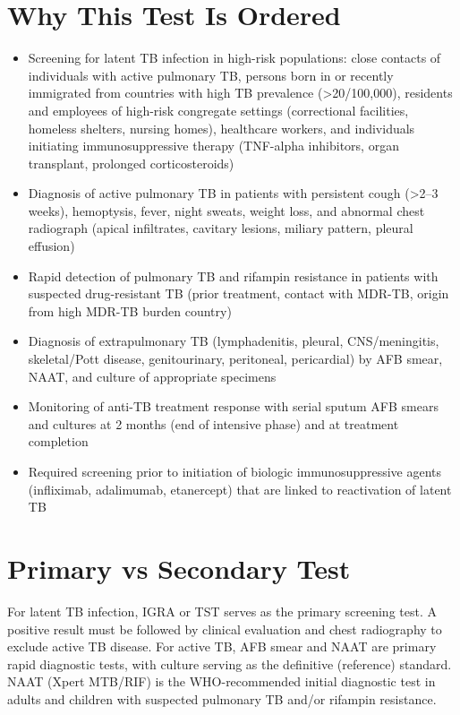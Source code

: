 \section*{Why This Test Is Ordered}
\begin{itemize}
  \item Screening for latent TB infection in high-risk populations: close contacts of individuals with active pulmonary TB, persons born in or recently immigrated from countries with high TB prevalence (>20/100,000), residents and employees of high-risk congregate settings (correctional facilities, homeless shelters, nursing homes), healthcare workers, and individuals initiating immunosuppressive therapy (TNF-alpha inhibitors, organ transplant, prolonged corticosteroids)
  \item Diagnosis of active pulmonary TB in patients with persistent cough (>2--3 weeks), hemoptysis, fever, night sweats, weight loss, and abnormal chest radiograph (apical infiltrates, cavitary lesions, miliary pattern, pleural effusion)
  \item Rapid detection of pulmonary TB and rifampin resistance in patients with suspected drug-resistant TB (prior treatment, contact with MDR-TB, origin from high MDR-TB burden country)
  \item Diagnosis of extrapulmonary TB (lymphadenitis, pleural, CNS/meningitis, skeletal/Pott disease, genitourinary, peritoneal, pericardial) by AFB smear, NAAT, and culture of appropriate specimens
  \item Monitoring of anti-TB treatment response with serial sputum AFB smears and cultures at 2 months (end of intensive phase) and at treatment completion
  \item Required screening prior to initiation of biologic immunosuppressive agents (infliximab, adalimumab, etanercept) that are linked to reactivation of latent TB
\end{itemize}

\section*{Primary vs Secondary Test}
For latent TB infection, IGRA or TST serves as the primary screening test. A positive result must be followed by clinical evaluation and chest radiography to exclude active TB disease. For active TB, AFB smear and NAAT are primary rapid diagnostic tests, with culture serving as the definitive (reference) standard. NAAT (Xpert MTB/RIF) is the WHO-recommended initial diagnostic test in adults and children with suspected pulmonary TB and/or rifampin resistance.

